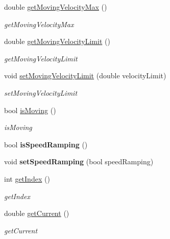 \begin{DoxyCompactItemize}
double \hyperlink{classdrobot_1_1device_1_1actuator_1_1PhidgetAdvancedServo_a47ecef350daf66de5cef9ce4df30f668}{get\-Moving\-Velocity\-Max} ()
\begin{DoxyCompactList}\small\item\em get\-Moving\-Velocity\-Max \end{DoxyCompactList}\item 
double \hyperlink{classdrobot_1_1device_1_1actuator_1_1PhidgetAdvancedServo_ab054ba63cd62f4a4088861cb63273aee}{get\-Moving\-Velocity\-Limit} ()
\begin{DoxyCompactList}\small\item\em get\-Moving\-Velocity\-Limit \end{DoxyCompactList}\item 
void \hyperlink{classdrobot_1_1device_1_1actuator_1_1PhidgetAdvancedServo_a2d075c4f19b30e8ac705f56b4dd55603}{set\-Moving\-Velocity\-Limit} (double velocity\-Limit)
\begin{DoxyCompactList}\small\item\em set\-Moving\-Velocity\-Limit \end{DoxyCompactList}\item 
bool \hyperlink{classdrobot_1_1device_1_1actuator_1_1PhidgetAdvancedServo_a4a12cf37d6421b7e109e2c6df0efde01}{is\-Moving} ()
\begin{DoxyCompactList}\small\item\em is\-Moving \end{DoxyCompactList}\item 
\hypertarget{classdrobot_1_1device_1_1actuator_1_1PhidgetAdvancedServo_aa2dc25484399961d9b02a4cbad9b31f6}{bool {\bfseries is\-Speed\-Ramping} ()}\label{classdrobot_1_1device_1_1actuator_1_1PhidgetAdvancedServo_aa2dc25484399961d9b02a4cbad9b31f6}

\item 
\hypertarget{classdrobot_1_1device_1_1actuator_1_1PhidgetAdvancedServo_aaf173f589ee7dee578ef960919debee3}{void {\bfseries set\-Speed\-Ramping} (bool speed\-Ramping)}\label{classdrobot_1_1device_1_1actuator_1_1PhidgetAdvancedServo_aaf173f589ee7dee578ef960919debee3}

\item 
int \hyperlink{classdrobot_1_1device_1_1actuator_1_1PhidgetAdvancedServo_abab8f3244b803c8cc0c58690f21b22ed}{get\-Index} ()
\begin{DoxyCompactList}\small\item\em get\-Index \end{DoxyCompactList}\item 
double \hyperlink{classdrobot_1_1device_1_1actuator_1_1PhidgetAdvancedServo_a7594207481582d74e3921f9520b47d74}{get\-Current} ()
\begin{DoxyCompactList}\small\item\em get\-Current \end{DoxyCompactList}\end{DoxyCompactItemize}
